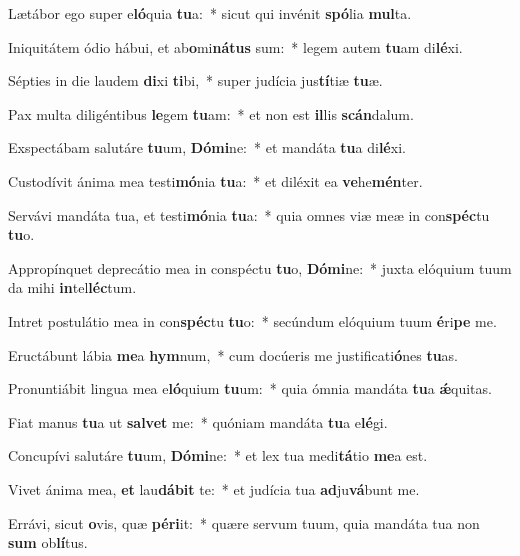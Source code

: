 \item Lætábor ego super e\textbf{ló}quia \textbf{tu}a:~* sicut qui invénit \textbf{spó}lia \textbf{mul}ta.
\item Iniquitátem ódio hábui, et ab\textbf{o}mi\textbf{ná}\textbf{tus} sum:~* legem autem \textbf{tu}am di\textbf{lé}xi.
\item Sépties in die laudem \textbf{di}xi \textbf{ti}bi,~* super judícia jus\textbf{tí}tiæ \textbf{tu}æ.
\item Pax multa diligéntibus \textbf{le}gem \textbf{tu}am:~* et non est \textbf{il}lis \textbf{scán}dalum.
\item Exspectábam salutáre \textbf{tu}um, \textbf{Dó}\textbf{mi}ne:~* et mandáta \textbf{tu}a di\textbf{lé}xi.
\item Custodívit ánima mea testi\textbf{mó}nia \textbf{tu}a:~* et diléxit ea \textbf{ve}he\textbf{mén}ter.
\item Servávi mandáta tua, et testi\textbf{mó}nia \textbf{tu}a:~* quia omnes viæ meæ in con\textbf{spéc}tu \textbf{tu}o.
\item Appropínquet deprecátio mea in conspéctu \textbf{tu}o, \textbf{Dó}\textbf{mi}ne:~* juxta elóquium tuum da mihi \textbf{in}tel\textbf{léc}tum.
\item Intret postulátio mea in con\textbf{spéc}tu \textbf{tu}o:~* secúndum elóquium tuum \textbf{é}ri\textbf{pe} me.
\item Eructábunt lábia \textbf{me}a \textbf{hym}num,~* cum docúeris me justificati\textbf{ó}nes \textbf{tu}as.
\item Pronuntiábit lingua mea e\textbf{ló}quium \textbf{tu}um:~* quia ómnia mandáta \textbf{tu}a \textbf{ǽ}quitas.
\item Fiat manus \textbf{tu}a ut \textbf{sal}\textbf{vet} me:~* quóniam mandáta \textbf{tu}a e\textbf{lé}gi.
\item Concupívi salutáre \textbf{tu}um, \textbf{Dó}\textbf{mi}ne:~* et lex tua medi\textbf{tá}tio \textbf{me}a est.
\item Vivet ánima mea, \textbf{et} lau\textbf{dá}\textbf{bit} te:~* et judícia tua \textbf{ad}ju\textbf{vá}bunt me.
\item Errávi, sicut \textbf{o}vis, quæ \textbf{pér}\textbf{i}it:~* quære servum tuum, quia mandáta tua non \textbf{sum} ob\textbf{lí}tus.
